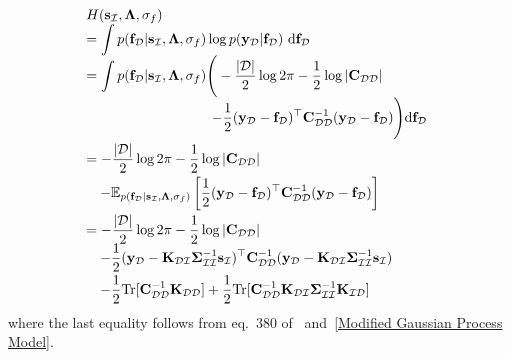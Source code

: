 \documentclass[conference]{IEEEtran}
\begin{document}
	\begin{equation*}
		\hspace{-1.7mm}
		\begin{array}{l}
			H(\mathbf{s}_\mathcal{I},\mathbf{\Lambda},\sigma_f)\\
			\displaystyle=\int p(\mathbf{f}_\mathcal{D}|\mathbf{s}_\mathcal{I},\mathbf{\Lambda},\sigma_f)\log p(\mathbf{y}_\mathcal{D}|\mathbf{f}_\mathcal{D})\ \mathrm{d}\mathbf{f}_\mathcal{D}  \\
			\displaystyle = \int p(\mathbf{f}_\mathcal{D}|\mathbf{s}_\mathcal{I},\mathbf{\Lambda},\sigma_f)
			\Bigg(-\frac{|\mathcal{D}|}{2}\log2\pi-\frac{1}{2}\log|\mathbf{C}_\mathcal{DD}|\\
			\displaystyle\quad\qquad\qquad\qquad\qquad-\frac{1}{2}(\mathbf{y}_\mathcal{D}-\mathbf{f}_\mathcal{D})^\top\mathbf{C}_\mathcal{DD}^{-1}(\mathbf{y}_\mathcal{D}-\mathbf{f}_\mathcal{D})\Bigg) \mathrm{d}\mathbf{f}_\mathcal{D} \vspace{1mm}\\
			\displaystyle = -\frac{|\mathcal{D}|}{2}\log2\pi-\frac{1}{2}\log|\mathbf{C}_\mathcal{DD}|\vspace{1mm}\\
			\displaystyle\quad-\mathbb{E}_{p(\mathbf{f}_\mathcal{D}|\mathbf{s}_\mathcal{I},\mathbf{\Lambda},\sigma_f)}\left[\frac{1}{2}(\mathbf{y}_\mathcal{D}-\mathbf{f}_\mathcal{D})^\top\mathbf{C}_\mathcal{DD}^{-1}(\mathbf{y}_\mathcal{D}-\mathbf{f}_\mathcal{D})\right] \vspace{1mm}\\
			\displaystyle = -\frac{|\mathcal{D}|}{2}\log2\pi-\frac{1}{2}\log|\mathbf{C}_\mathcal{DD}|\\
			\displaystyle\quad-\frac{1}{2}(\mathbf{y}_\mathcal{D}-\mathbf{K}_\mathcal{DI}\mathbf{\Sigma}_\mathcal{II}^{-1}\mathbf{s}_\mathcal{I})^\top\mathbf{C}_\mathcal{DD}^{-1}(\mathbf{y}_\mathcal{D}-\mathbf{K}_\mathcal{DI}\mathbf{\Sigma}_\mathcal{II}^{-1}\mathbf{s}_\mathcal{I})\vspace{1mm}\\
			\displaystyle\quad-\frac{1}{2}\mathrm{Tr}[\mathbf{C}_\mathcal{DD}^{-1}\mathbf{K}_\mathcal{DD}]+\frac{1}{2}\mathrm{Tr}[\mathbf{C}_\mathcal{DD}^{-1}\mathbf{K}_\mathcal{DI}\mathbf{\Sigma}_\mathcal{II}^{-1}\mathbf{K}_\mathcal{ID}]
		\end{array}			
	\end{equation*}
	where the last equality follows from eq.~$380$ of~\cite{IMM2012-03274} and~\eqref{Modified Gaussian Process Model}.
	
\end{document}
